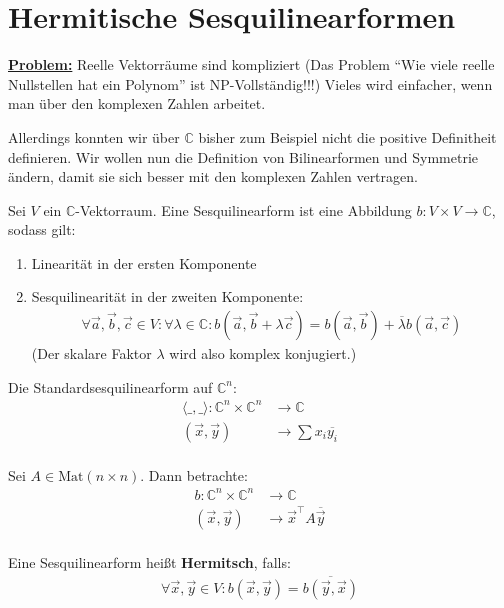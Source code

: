 \documentclass{report}
\newcommand*{\newpar}{\par\vspace{\baselineskip}\noindent}
\newcommand{\tbf}[1]{\textbf{#1}}
\newcommand{\ul}[1]{\underline{#1}}
\newcommand{\bC}{\mathbb{C}}
\newcommand{\vc}{\vec{c}}
\newcommand{\vx}{\vec{x}}
\newcommand{\vy}{\vec{y}}
\newcommand{\Matnn}{\text{Mat}(n \times n)}
\newcommand{\scalar}[2]{\langle #1, #2 \rangle}
\begin{document}
\section{Hermitische Sesquilinearformen}
\ul{\tbf{Problem:}} Reelle Vektorräume sind kompliziert (Das Problem ``Wie viele reelle Nullstellen hat ein Polynom'' ist NP-Vollständig!!!) Vieles wird einfacher, wenn man über den komplexen Zahlen arbeitet. 
\newpar
Allerdings konnten wir über $\bC$ bisher zum Beispiel nicht die positive Definitheit definieren. Wir wollen nun die Definition von Bilinearformen und Symmetrie ändern, damit sie sich besser mit den komplexen Zahlen vertragen.
\begin{definition}
 Sei $V$ ein $\bC$-Vektorraum. Eine Sesquilinearform ist eine Abbildung $b : V \times V \to \bC$, sodass gilt:
 \begin{enumerate}
  \item Linearität in der ersten Komponente
  \item Sesquilinearität in der zweiten Komponente:
  \begin{align*}
   \forall \vec{a}, \vec{b}, \vc \in V : \forall \lambda \in \bC : b(\vec{a}, \vec{b} + \lambda \vc) = b(\vec{a}, \vec{b}) + \overline{\lambda}b(\vec{a}, \vc)
  \end{align*}
  (Der skalare Faktor $\lambda$ wird also komplex konjugiert.)
 \end{enumerate}
\end{definition}
\begin{beispiel}
 Die Standardsesquilinearform auf $\bC^n$:
 \begin{align*}
  \scalar{\_}{\_}  : \bC^n \times \bC^n &\to \bC\\
  (\vx, \vy) &\to \sum x_i \overline{y_i}\\
 \end{align*}
\end{beispiel}
\begin{beispiel}
 Sei $A \in \Matnn$. Dann betrachte:
 \begin{align*}
  b : \bC^n \times \bC^n &\to \bC\\
  (\vx, \vy) &\to \vx^\top A \overline{\vy}\\
 \end{align*}
\end{beispiel}
\begin{definition}
 Eine Sesquilinearform heißt \tbf{Hermitsch}, falls:
 \begin{align*}
  \forall \vx, \vy \in V : b(\vx, \vy) = \overline{b(\vy, \vx)}
 \end{align*}
\end{definition}
\end{document}
